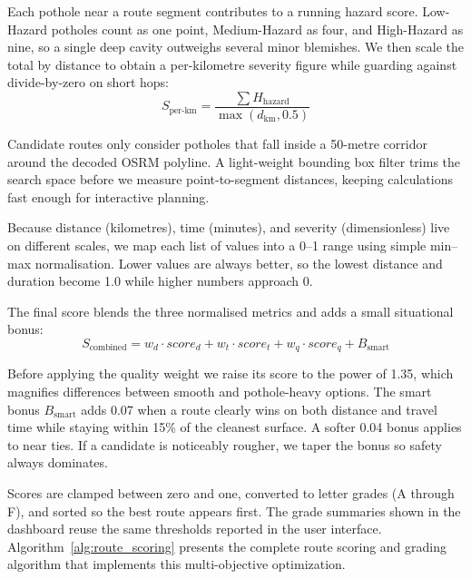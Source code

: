 \documentclass{ieeeaccess}
\begin{document}
Each pothole near a route segment contributes to a running hazard score. Low-Hazard potholes count as one point, Medium-Hazard as four, and High-Hazard as nine, so a single deep cavity outweighs several minor blemishes. We then scale the total by distance to obtain a per-kilometre severity figure while guarding against divide-by-zero on short hops:
\begin{equation}
S_{\text{per-km}} = \frac{\sum H_{\text{hazard}}}{\max(d_{\text{km}}, 0.5)}
\end{equation}

Candidate routes only consider potholes that fall inside a 50-metre corridor around the decoded OSRM polyline. A light-weight bounding box filter trims the search space before we measure point-to-segment distances, keeping calculations fast enough for interactive planning.

Because distance (kilometres), time (minutes), and severity (dimensionless) live on different scales, we map each list of values into a 0--1 range using simple min--max normalisation. Lower values are always better, so the lowest distance and duration become 1.0 while higher numbers approach 0.

The final score blends the three normalised metrics and adds a small situational bonus:
\begin{equation}
S_{\text{combined}} = w_d \cdot score_d + w_t \cdot score_t + w_q \cdot score_q + B_{\text{smart}}
\end{equation}

Before applying the quality weight we raise its score to the power of 1.35, which magnifies differences between smooth and pothole-heavy options. The smart bonus $B_{\text{smart}}$ adds 0.07 when a route clearly wins on both distance and travel time while staying within 15\% of the cleanest surface. A softer 0.04 bonus applies to near ties. If a candidate is noticeably rougher, we taper the bonus so safety always dominates.

Scores are clamped between zero and one, converted to letter grades (A through F), and sorted so the best route appears first. The grade summaries shown in the dashboard reuse the same thresholds reported in the user interface. Algorithm~\ref{alg:route_scoring} presents the complete route scoring and grading algorithm that implements this multi-objective optimization.
\end{document}
